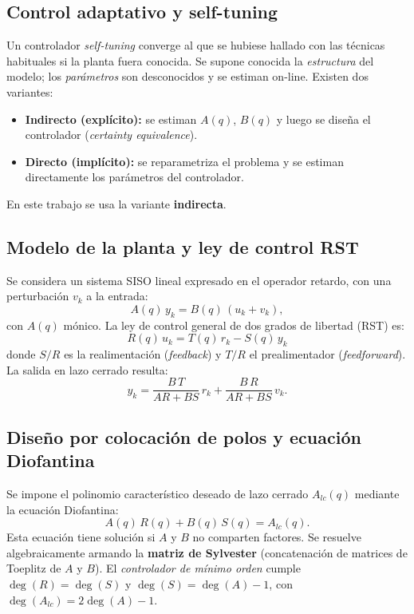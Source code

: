 \documentclass[a4paper,11pt]{report}
\begin{document}
\subsection{Control adaptativo y self-tuning}

Un controlador \emph{self-tuning} converge al que se hubiese hallado con las
técnicas habituales si la planta fuera conocida. Se supone conocida la
\emph{estructura} del modelo; los \emph{parámetros} son desconocidos y se
estiman on-line. Existen dos variantes:

\begin{itemize}[nosep]
  \item \textbf{Indirecto (explícito):} se estiman $A(q)$, $B(q)$ y luego se
  diseña el controlador (\emph{certainty equivalence}).
  \item \textbf{Directo (implícito):} se reparametriza el problema y se estiman
  directamente los parámetros del controlador.
\end{itemize}

En este trabajo se usa la variante \textbf{indirecta}.

\subsection{Modelo de la planta y ley de control RST}

Se considera un sistema SISO lineal expresado en el operador retardo, con una
perturbación $v_k$ a la entrada:
\begin{equation}
  A(q)\, y_k = B(q)\,(u_k + v_k),
\end{equation}
con $A(q)$ mónico. La ley de control general de dos grados de libertad (RST) es:
\begin{equation}
  \boxed{\,R(q)\, u_k = T(q)\, r_k - S(q)\, y_k\,}
  \label{eq:rst}
\end{equation}
donde $S/R$ es la realimentación (\emph{feedback}) y $T/R$ el prealimentador
(\emph{feedforward}). La salida en lazo cerrado resulta:
\begin{equation}
  y_k = \frac{B\,T}{A R + B S}\, r_k + \frac{B\,R}{A R + B S}\, v_k .
  \label{eq:lc}
\end{equation}

\subsection{Diseño por colocación de polos y ecuación Diofantina}

Se impone el polinomio característico deseado de lazo cerrado $A_{lc}(q)$
mediante la ecuación Diofantina:
\begin{equation}
  A(q)\,R(q) + B(q)\,S(q) = A_{lc}(q).
  \label{eq:diof}
\end{equation}
Esta ecuación tiene solución si $A$ y $B$ no comparten factores. Se resuelve
algebraicamente armando la \textbf{matriz de Sylvester} (concatenación de
matrices de Toeplitz de $A$ y $B$). El \emph{controlador de mínimo orden}
cumple $\deg(R) = \deg(S)$ y $\deg(S) = \deg(A) - 1$, con
$\deg(A_{lc}) = 2\deg(A) - 1$.
\end{document}
